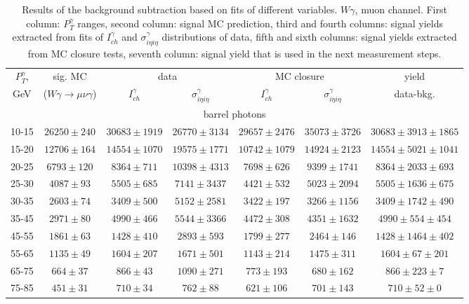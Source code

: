 \begin{table}[h]
  \tiny
  \begin{center}
  \caption{Results of the background subtraction based on fits of different variables. $W\gamma$, muon channel. First column: $P_T^{\gamma}$ ranges, second column: signal MC prediction, third and fourth columns: signal yields extracted from fits of $I_{ch}^{\gamma}$ and $\sigma_{i\eta i\eta}^\gamma$ distributions of data, fifth and sixth columns: signal yields extracted from MC closure tests, seventh column: signal yield that is used in the next measurement steps.}
  \begin{tabular}{|c|c|c|c|c|c|c|}
    $P_T^{\gamma}$, &  sig. MC   & \multicolumn{2}{|c|}{data}  & \multicolumn{2}{|c|}{MC closure} & yield\\ 
    GeV & ($W\gamma\rightarrow\mu\nu\gamma$) & $I_{ch}^{\gamma}$ & $\sigma_{i\eta i\eta}^\gamma$  & $I_{ch}^{\gamma}$  & $\sigma_{i\eta i\eta}^\gamma$   & data-bkg. \\ \hline
    \multicolumn{7}{|c|}{barrel photons} \\ \hline
    10-15 & $26250\pm240$ & $30683\pm1919$ & $26770\pm3134$ & $29657\pm2476$ & $35073\pm3726$ &$30683\pm3913\pm1865$  \\ \hline
    15-20 & $12706\pm164$ & $14554\pm1070$ & $19575\pm1771$ & $10742\pm1079$ & $14924\pm2123$ &$14554\pm5021\pm1041$  \\ \hline
    20-25 & $6793\pm120$ & $8364\pm711$ & $10398\pm4313$ & $7698\pm626$ & $9399\pm1741$ &$8364\pm2033\pm693$  \\ \hline
    25-30 & $4087\pm93$ & $5505\pm685$ & $7141\pm3437$ & $4421\pm532$ & $5023\pm2094$ &$5505\pm1636\pm675$  \\ \hline
    30-35 & $2603\pm74$ & $3409\pm500$ & $5152\pm2581$ & $3422\pm197$ & $3266\pm1156$ &$3409\pm1742\pm490$  \\ \hline
    35-45 & $2971\pm80$ & $4990\pm466$ & $5544\pm3366$ & $4472\pm308$ & $4351\pm1632$ &$4990\pm554\pm454$  \\ \hline
    45-55 & $1861\pm63$ & $1428\pm410$ & $2893\pm593$ & $1799\pm277$ & $2464\pm146$ &$1428\pm1464\pm402$  \\ \hline
    55-65 & $1135\pm49$ & $1604\pm207$ & $1671\pm501$ & $1143\pm214$ & $1475\pm311$ &$1604\pm67\pm201$  \\ \hline
    65-75 & $664\pm37$ & $866\pm43$ & $1090\pm271$ & $773\pm193$ & $680\pm162$ &$866\pm223\pm7$  \\ \hline
    75-85 & $451\pm31$ & $710\pm34$ & $762\pm88$ & $621\pm106$ & $701\pm143$ &$710\pm52\pm0$  \\ \hline

\end{tabular}
\end{center}
\end{table}
